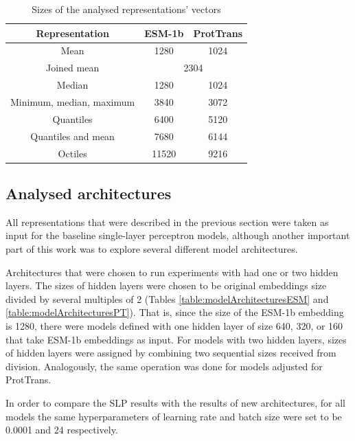 \documentclass[12pt]{article}
\begin{document}
    \newpage

	\begin{table}[h!]
		\caption{Sizes of the analysed representations' vectors}
		\vspace{0.2cm}
		\centering
		\begin{tabular}{ | c | c c | }
			\hline 
			Representation & ESM-1b & ProtTrans \\
			\hline 
			Mean & 1280 & 1024 \\
			Joined mean & \multicolumn{2}{c|}{2304} \\
			Median & 1280 & 1024 \\
			Minimum, median, maximum & 3840 & 3072 \\
			Quantiles & 6400 & 5120 \\
			Quantiles and mean & 7680 & 6144 \\
			Octiles & 11520 & 9216 \\
			\hline    
		\end{tabular}
		\label{table:vectorsDimensions}
	\end{table}

	\newpage

	\subsection{Analysed architectures}

	All representations that were described
	in the previous section were taken as input for the baseline
	single-layer perceptron models, although another important part 
	of this work was to explore several different 
	model architectures. 

	Architectures that were chosen to run experiments with 
	had one or two hidden layers. The sizes of hidden layers 
	were chosen to be original embeddings size divided 
	by several multiples of 2 (Tables \ref{table:modelArchitecturesESM} 
	and \ref{table:modelArchitecturesPT}). That is, since the 
	size of the ESM-1b embedding is 1280, there were 
	models defined with one hidden layer of size 640, 320, or 160 
	that take ESM-1b embeddings as input. For models with two 
	hidden layers, sizes of hidden layers were assigned by 
	combining two sequential sizes received from division. 
	Analogously, the same operation was done for models adjusted 
	for ProtTrans.

	In order to compare the SLP results with the results of new 
	architectures, for all models the same hyperparameters 
	of learning rate and 
	batch size were set to be 0.0001 and 24 respectively.
\end{document}
